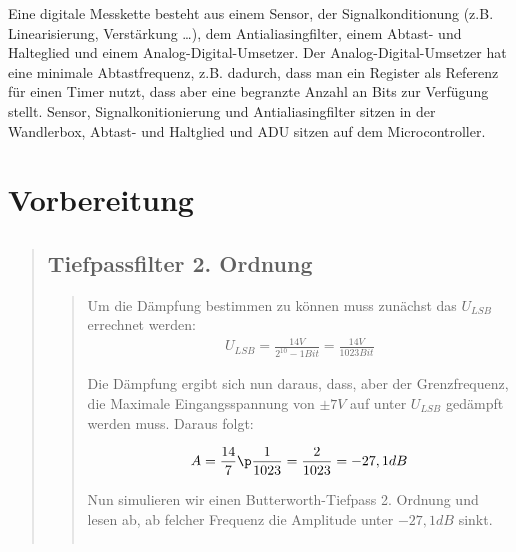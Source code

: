 \bq

Eine digitale Messkette besteht aus einem Sensor, der Signalkonditionung (z.B.
Linearisierung, Verstärkung \ldots), dem Antialiasingfilter, einem Abtast- und
Halteglied und einem Analog-Digital-Umsetzer.
Der Analog-Digital-Umsetzer hat eine minimale Abtastfrequenz, z.B. dadurch, dass
man ein Register als Referenz für einen Timer nutzt, dass aber eine begranzte
Anzahl an Bits zur Verfügung stellt.
Sensor, Signalkonitionierung und Antialiasingfilter sitzen in der Wandlerbox,
Abtast- und Haltglied und ADU sitzen auf dem Microcontroller.
\section{Vorbereitung}
\begin{quote}
    
    \subsection{Tiefpassfilter 2. Ordnung}
    \begin{quote}
        
        Um die Dämpfung bestimmen zu können muss zunächst das $U_{LSB}$ errechnet werden:
        \begin{equation}
    	\begin{split}
    		U_{LSB} = \frac{14V}{2^{10} - 1 Bit} = \frac{14V}{1023 Bit}
    	\end{split}
        \end{equation}
        
        Die Dämpfung ergibt sich nun daraus, dass, aber der Grenzfrequenz, die Maximale Eingangsspannung von $\pm 7V$ auf unter $U_{LSB}$ gedämpft
        werden muss.
        Daraus folgt:
        
        
        \begin{equation}
    	\begin{split}
    		A = \frac{14}{7} \p \frac{1}{1023} = \frac{2}{1023} = -27,1 dB
    	\end{split}
        \end{equation}
        
        
        Nun simulieren wir einen Butterworth-Tiefpass 2. Ordnung und lesen ab, ab felcher Frequenz die Amplitude unter $-27,1 dB$ sinkt.
        
        \begin{center}
        \vspace{-1.5cm}
        \begin{tabular}{ll}
        

\end{tabular}
\end{center}
\end{quote}
\end{quote}
